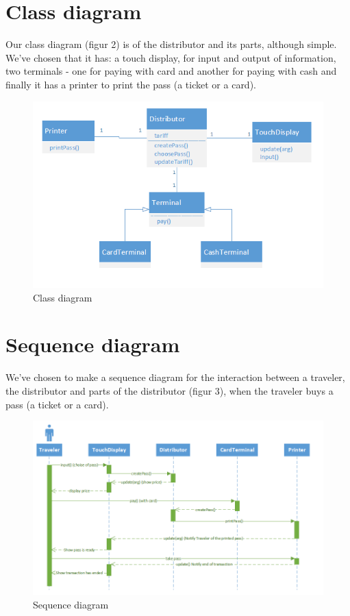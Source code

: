 \documentclass[pdftex,12pt,a4paper]{article}
\begin{document}
\section{Class diagram}
Our class diagram (figur 2) is of the distributor and its parts, although simple. We've chosen that it has: a touch display, for input and output of information, two terminals - one for paying with card and another for paying with cash and finally it has a printer to print the pass (a ticket or a card).
\begin{figure}[h]
\centering
\includegraphics[scale = 0.9]{class.png}
\caption{Class diagram}
\end{figure}

\pagebreak

\section{Sequence diagram}
We've chosen to make a sequence diagram for the  interaction between a traveler, the distributor and parts of the distributor (figur 3), when the traveler buys a pass (a ticket or a card).
\begin{figure}[h]
\centering
\includegraphics[scale = 0.7]{sequence.png}
\caption{Sequence diagram}
\end{figure}
\end{document}
